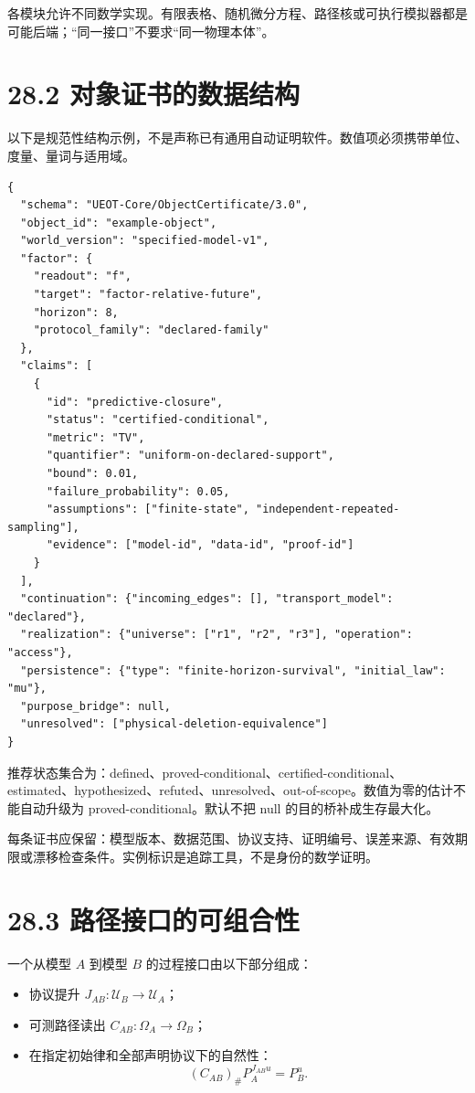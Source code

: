\documentclass[
  11pt,
  oneside]{book}
\providecommand{\tightlist}{%
  \setlength{\itemsep}{0pt}\setlength{\parskip}{0pt}}
\begin{document}
各模块允许不同数学实现。有限表格、随机微分方程、路径核或可执行模拟器都是可能后端；``同一接口''不要求``同一物理本体''。

\section{28.2 对象证书的数据结构}\label{ux5bf9ux8c61ux8bc1ux4e66ux7684ux6570ux636eux7ed3ux6784}

以下是规范性结构示例，不是声称已有通用自动证明软件。数值项必须携带单位、度量、量词与适用域。

\begin{verbatim}
{
  "schema": "UEOT-Core/ObjectCertificate/3.0",
  "object_id": "example-object",
  "world_version": "specified-model-v1",
  "factor": {
    "readout": "f",
    "target": "factor-relative-future",
    "horizon": 8,
    "protocol_family": "declared-family"
  },
  "claims": [
    {
      "id": "predictive-closure",
      "status": "certified-conditional",
      "metric": "TV",
      "quantifier": "uniform-on-declared-support",
      "bound": 0.01,
      "failure_probability": 0.05,
      "assumptions": ["finite-state", "independent-repeated-sampling"],
      "evidence": ["model-id", "data-id", "proof-id"]
    }
  ],
  "continuation": {"incoming_edges": [], "transport_model": "declared"},
  "realization": {"universe": ["r1", "r2", "r3"], "operation": "access"},
  "persistence": {"type": "finite-horizon-survival", "initial_law": "mu"},
  "purpose_bridge": null,
  "unresolved": ["physical-deletion-equivalence"]
}
\end{verbatim}

推荐状态集合为：defined、proved-conditional、certified-conditional、estimated、hypothesized、refuted、unresolved、out-of-scope。数值为零的估计不能自动升级为 proved-conditional。默认不把 null 的目的桥补成生存最大化。

每条证书应保留：模型版本、数据范围、协议支持、证明编号、误差来源、有效期限或漂移检查条件。实例标识是追踪工具，不是身份的数学证明。

\section{28.3 路径接口的可组合性}\label{ux8defux5f84ux63a5ux53e3ux7684ux53efux7ec4ux5408ux6027}

一个从模型 \(A\) 到模型 \(B\) 的过程接口由以下部分组成：

\begin{itemize}
\tightlist
\item
  协议提升 \(J_{AB}:\mathcal U_B\to\mathcal U_A\)；
\item
  可测路径读出 \(C_{AB}:\Omega_A\to\Omega_B\)；
\item
  在指定初始律和全部声明协议下的自然性： \[(C_{AB})_\#P_A^{J_{AB}u}=P_B^u.\]
\end{itemize}
\end{document}
